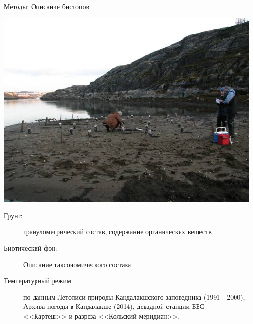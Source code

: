 \documentclass{beamer}
\begin{document}
\begin{frame}{Методы: Описание биотопов}
\begin{minipage}[c]{.3\linewidth}
\begin{center}
			\includegraphics[width=\textwidth]{Pala.JPG}
		\end{center}
	\end{minipage}
	\begin{minipage}[c]{.60\linewidth}
\begin{small}
 \begin{description}

	\item[Грунт:] 

гранулометрический состав, содержание органических веществ

	\item[Биотический фон:] Описание таксономического состава

	\item[Температурный режим:] по данным Летописи природы Кандалакшского заповедника (1991 - 2000), Архива погоды в Кандалакше (2014), декадной станции ББС <<Картеш>> и разреза <<Кольский меридиан>>. 
  \end{description}
\end{small}

	\end{minipage}
\end{frame}
\end{document}
